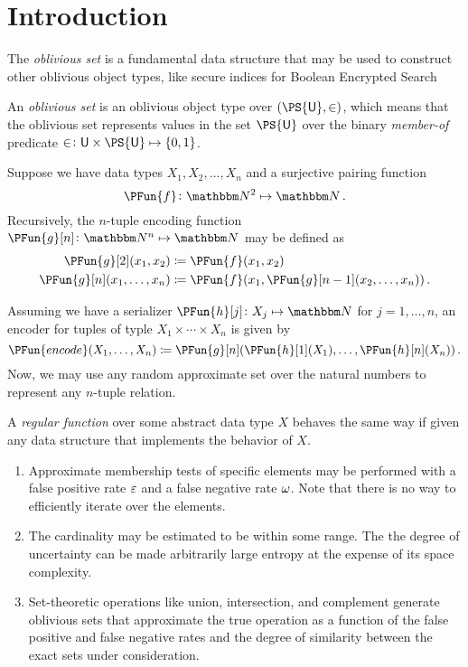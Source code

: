 \documentclass[ ../main.tex]{subfiles}
\begin{document}
\section{Introduction}
The \emph{oblivious set}\cite{oset} is a fundamental data structure that may be used to construct other oblivious object types, like secure indices for Boolean Encrypted Search\cite{sibool}

An \emph{oblivious set} is an oblivious object type over 
$(\PS{\Set{U}},\SetContains)$, which means that the oblivious set represents values in the set $\PS{\Set{U}}$ over the binary \emph{member-of} predicate $\SetContains \colon \Set{U} \times \PS{\Set{U}} \mapsto \{0,1\}$.

Suppose we have data types $X_1,X_2,\ldots,X_n$ and a surjective pairing function
\begin{equation}
    \PFun{f} \colon \NatSet^2 \mapsto \NatSet\,.
\end{equation}
Recursively, the $n$-tuple encoding function $\PFun{g}[n] \colon \NatSet^n \mapsto \NatSet$ may be defined as
\begin{align}
	\PFun{g}[2](x_1,x_2)		&\coloneqq \PFun{f}(x_1, x_2)\\
	\PFun{g}[n](x_1,\ldots,x_n) &\coloneqq \PFun{f}(x_1, \PFun{g}[n-1](x_2,\ldots,x_n))\,.
\end{align}

Assuming we have a serializer $\PFun{h}[j] \colon X_j \mapsto \NatSet$ for $j=1,\ldots,n$, an encoder for tuples of typle $X_1 \times \cdots \times X_n$ is given by
\begin{equation}
	\PFun{encode}(X_1,\ldots,X_n) \coloneqq \PFun{g}[n](\PFun{h}[1](X_1),\ldots,\PFun{h}[n](X_n))\,.
\end{equation}
Now, we may use any random approximate set over the natural numbers to represent any $n$-tuple relation.

A \emph{regular function} over some abstract data type $X$ behaves the same way 
if given any data structure that implements the behavior of $X$. 

\begin{enumerate}
    \item Approximate membership tests of specific elements may be performed with a false positive rate $\varepsilon$ and a false negative rate $\omega$. Note that there is no way to efficiently iterate over the elements.
    
    \item The cardinality may be estimated to be within some range. The the degree of uncertainty can be made arbitrarily large entropy at the expense of its space complexity.
        
    \item Set-theoretic operations like union, intersection, and complement generate oblivious sets that approximate the true operation as a function of the false positive and false negative rates and the degree of similarity between the exact sets under consideration.
\end{enumerate}
\end{document}
